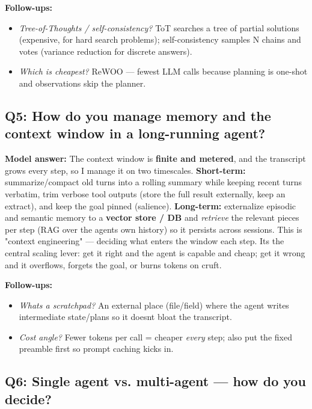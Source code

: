 \documentclass[11pt]{article}
\providecommand{\tightlist}{\setlength{\itemsep}{1pt}\setlength{\parskip}{0pt}}
\begin{document}
\textbf{Follow-ups:}

\begin{itemize}
\tightlist
\item
  \emph{Tree-of-Thoughts / self-consistency?} ToT searches a tree of partial solutions (expensive, for hard search problems); self-consistency samples N chains and votes (variance reduction for discrete answers).
\item
  \emph{Which is cheapest?} ReWOO --- fewest LLM calls because planning is one-shot and observations skip the planner.
\end{itemize}

\subsection{Q5: How do you manage memory and the context window in a long-running agent?}\label{q5-how-do-you-manage-memory-and-the-context-window-in-a-long-running-agent}

\textbf{Model answer:} The context window is \textbf{finite and metered}, and the transcript grows every step, so I manage it on two timescales. \textbf{Short-term:} summarize/compact old turns into a rolling summary while keeping recent turns verbatim, trim verbose tool outputs (store the full result externally, keep an extract), and keep the goal pinned (salience). \textbf{Long-term:} externalize episodic and semantic memory to a \textbf{vector store / DB} and \emph{retrieve} the relevant pieces per step (RAG over the agent\textquotesingle s own history) so it persists across sessions. This is "context engineering" --- deciding what enters the window each step. It\textquotesingle s the central scaling lever: get it right and the agent is capable and cheap; get it wrong and it overflows, forgets the goal, or burns tokens on cruft.

\textbf{Follow-ups:}

\begin{itemize}
\tightlist
\item
  \emph{What\textquotesingle s a scratchpad?} An external place (file/field) where the agent writes intermediate state/plans so it doesn\textquotesingle t bloat the transcript.
\item
  \emph{Cost angle?} Fewer tokens per call = cheaper \emph{every} step; also put the fixed preamble first so prompt caching kicks in.
\end{itemize}

\subsection{Q6: Single agent vs. multi-agent --- how do you decide?}\label{q6-single-agent-vs-multi-agent--how-do-you-decide}
\end{document}
